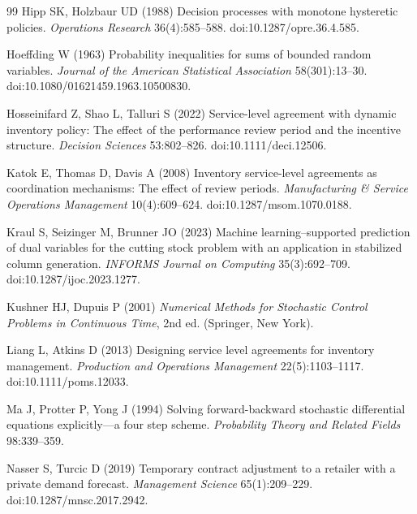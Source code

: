 \documentclass[11pt,letterpaper]{article}
\theoremstyle{definition}
\newcommand{\1}{\mathbf 1}
\begin{document}
\begin{thebibliography}{99}
Hipp SK, Holzbaur UD (1988) Decision processes with monotone hysteretic policies. \emph{Operations Research} 36(4):585--588. doi:10.1287/opre.36.4.585.

Hoeffding W (1963) Probability inequalities for sums of bounded random variables. \emph{Journal of the American Statistical Association} 58(301):13--30. doi:10.1080/01621459.1963.10500830.

Hosseinifard Z, Shao L, Talluri S (2022) Service-level agreement with dynamic inventory policy: The effect of the performance review period and the incentive structure. \emph{Decision Sciences} 53:802--826. doi:10.1111/deci.12506.

Katok E, Thomas D, Davis A (2008) Inventory service-level agreements as coordination mechanisms: The effect of review periods. \emph{Manufacturing \& Service Operations Management} 10(4):609--624. doi:10.1287/msom.1070.0188.

Kraul S, Seizinger M, Brunner JO (2023) Machine learning--supported prediction of dual variables for the cutting stock problem with an application in stabilized column generation. \emph{INFORMS Journal on Computing} 35(3):692--709. doi:10.1287/ijoc.2023.1277.

Kushner HJ, Dupuis P (2001) \emph{Numerical Methods for Stochastic Control Problems in Continuous Time}, 2nd ed. (Springer, New York).

Liang L, Atkins D (2013) Designing service level agreements for inventory management. \emph{Production and Operations Management} 22(5):1103--1117. doi:10.1111/poms.12033.

Ma J, Protter P, Yong J (1994) Solving forward-backward stochastic differential equations explicitly---a four step scheme. \emph{Probability Theory and Related Fields} 98:339--359.

Nasser S, Turcic D (2019) Temporary contract adjustment to a retailer with a private demand forecast. \emph{Management Science} 65(1):209--229. doi:10.1287/mnsc.2017.2942.



\end{thebibliography}
\end{document}
